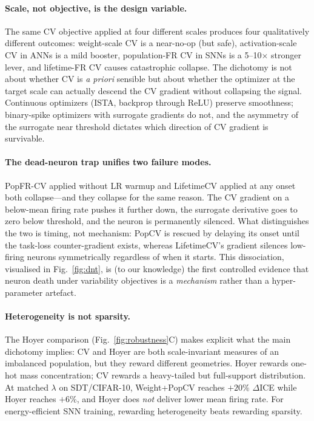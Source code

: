 \documentclass{article}
\begin{document}
\paragraph{Scale, not objective, is the design variable.} The same CV objective applied at four different scales produces four qualitatively different outcomes: weight-scale CV is a near-no-op (but safe), activation-scale CV in ANNs is a mild booster, population-FR CV in SNNs is a 5--10$\times$ stronger lever, and lifetime-FR CV causes catastrophic collapse. The dichotomy is not about whether CV is \emph{a priori} sensible but about whether the optimizer at the target scale can actually descend the CV gradient without collapsing the signal. Continuous optimizers (ISTA, backprop through ReLU) preserve smoothness; binary-spike optimizers with surrogate gradients do not, and the asymmetry of the surrogate near threshold dictates which direction of CV gradient is survivable.

\paragraph{The dead-neuron trap unifies two failure modes.} PopFR-CV applied without LR warmup and LifetimeCV applied at any onset both collapse---and they collapse for the same reason. The CV gradient on a below-mean firing rate pushes it further down, the surrogate derivative goes to zero below threshold, and the neuron is permanently silenced. What distinguishes the two is timing, not mechanism: PopCV is rescued by delaying its onset until the task-loss counter-gradient exists, whereas LifetimeCV's gradient silences low-firing neurons symmetrically regardless of when it starts. This dissociation, visualised in Fig.~\ref{fig:dnt}, is (to our knowledge) the first controlled evidence that neuron death under variability objectives is a \emph{mechanism} rather than a hyper-parameter artefact.

\paragraph{Heterogeneity is not sparsity.} The Hoyer comparison (Fig.~\ref{fig:robustness}C) makes explicit what the main dichotomy implies: CV and Hoyer are both scale-invariant measures of an imbalanced population, but they reward different geometries. Hoyer rewards one-hot mass concentration; CV rewards a heavy-tailed but full-support distribution. At matched $\lambda$ on SDT/CIFAR-10, Weight+PopCV reaches $+20\%$ $\Delta$ICE while Hoyer reaches $+6\%$, and Hoyer does \emph{not} deliver lower mean firing rate. For energy-efficient SNN training, rewarding heterogeneity beats rewarding sparsity.
\end{document}
